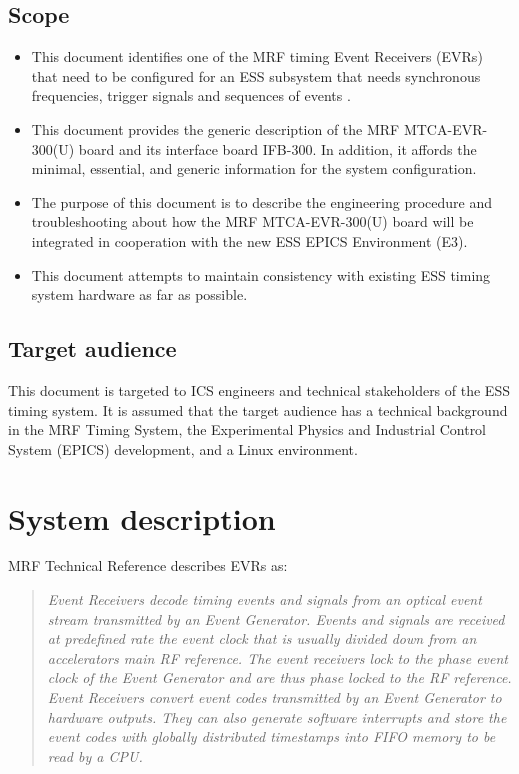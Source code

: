 \documentclass[11pt
  , a4paper
  , article
  , oneside
  , showtrims
]{memoir}
\begin{document}
\section{Scope}
\begin{itemize}
\item This document identifies one of the MRF timing Event Receivers (EVRs) that need to be configured for an ESS subsystem that needs synchronous frequencies, trigger signals and sequences of events \cite{MRFEVENTSYSTEMDC}.
\item This document provides the generic description of the MRF MTCA-EVR-300(U) board and its interface board IFB-300. In addition, it affords the minimal, essential, and generic information for the system configuration.
\item The purpose of this document is to describe the engineering procedure and troubleshooting about how the MRF MTCA-EVR-300(U) board will be integrated in cooperation with the new ESS EPICS Environment (E3).
\item This document attempts to maintain consistency with existing ESS timing system hardware as far as possible.
\end{itemize}


\section{Target audience}
This document is targeted to ICS engineers and technical stakeholders of the ESS timing system. It is assumed that the target audience has a technical background in the MRF Timing System, the Experimental Physics and Industrial Control System (EPICS) development, and a Linux environment.\\



\chapter{System description}
MRF Technical Reference \citep[see][p45]{MRFEVENTSYSTEMDC} describes EVRs as:
\blockquote{\textit{Event Receivers decode timing events and signals from an optical event stream transmitted by an Event Generator. Events and signals are received at predefined rate the event clock that is usually divided down from an accelerators main RF reference. The event receivers lock to the phase event clock of the Event Generator and are thus phase locked to the RF reference. Event Receivers convert event codes transmitted by an Event Generator to hardware outputs. They can also generate software interrupts and store the event codes with globally distributed timestamps into FIFO memory to be read by a CPU.}}
\end{document}
